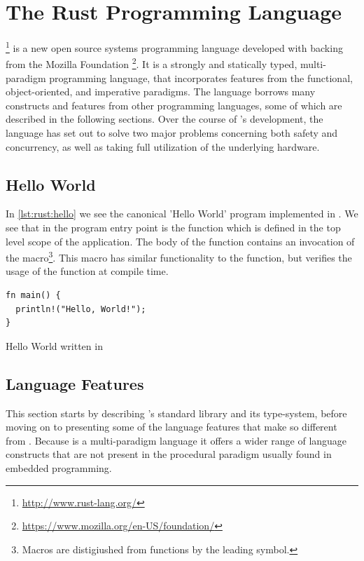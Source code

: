 
\section{The Rust Programming Language} %
\label{sub:the_rust_programming_language}

{\rust} \footnote{\url{http://www.rust-lang.org/}} is a new open source systems programming language developed with backing from the Mozilla Foundation \footnote{\url{https://www.mozilla.org/en-US/foundation/}}.
It is a strongly and statically typed, multi-paradigm programming language, that incorporates features from the functional, object-oriented, and imperative paradigms.
The language borrows many constructs and features from other programming languages, some of which are described in the following sections.
Over the course of {\rust}'s development, the language has set out to solve two major problems concerning both safety and concurrency, as well as taking full utilization of the underlying hardware.

\subsection{Hello World}

In \autoref{lst:rust:hello} we see the canonical 'Hello World' program implemented in {\rust}.
We see that in {\rust} the program entry point is the {\main} function which is defined in the top level scope of the application.
The body of the function contains an invocation of the  macro\footnote{Macros are distigiushed from functions by the leading \code{!} symbol.}.
This macro has similar functionality to the {\C}  function, but verifies the usage of the function at compile time.

\begin{listing}[H]
  \begin{verbatim}
fn main() {
  println!("Hello, World!");
}
  \end{verbatim}
  \caption{Hello World written in {\rust}}
  \label{lst:rust:hello}
\end{listing}

\subsection{Language Features}
\label{ssub:rust:features}

This section starts by describing {\rust}'s standard library and its type-system, before moving on to presenting some of the language features that make {\rust} so different from {\C}.
Because {\rust} is a multi-paradigm language it offers a wider range of language constructs that are not present in the procedural paradigm usually found in embedded programming.

